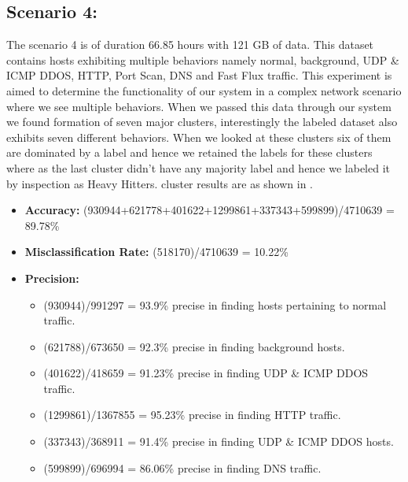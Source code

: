 \subsection{Scenario 4:}
The scenario 4 is of duration 66.85 hours with 121 GB of data. This dataset contains hosts exhibiting multiple behaviors namely normal, background, UDP \& ICMP DDOS, HTTP, Port Scan, DNS and Fast Flux traffic. This experiment is aimed to determine the functionality of our system in a complex network scenario where we see multiple behaviors. When we passed this data through our system we found formation of seven major clusters, interestingly the labeled dataset also exhibits seven different behaviors. When we looked at these clusters six of them are dominated by a label and hence we retained the labels for these clusters where as the last cluster didn't have any majority label and hence we labeled it by inspection as Heavy Hitters. cluster  results are as shown in .

\begin{itemize}
	\item \textbf{Accuracy:}  (930944+621778+401622+1299861+337343+599899)/4710639 = 89.78\%
	
	\item \textbf{Misclassification Rate:} (518170)/4710639 = 10.22\%
	
	\item \textbf{Precision:} 
	\begin{itemize}			
		
		\item (930944)/991297 = 93.9\% precise in finding hosts pertaining to normal traffic.
		
		\item (621788)/673650 = 92.3\% precise in finding background hosts.
		
		\item (401622)/418659 = 91.23\% precise in finding UDP \& ICMP DDOS traffic.
		
		\item (1299861)/1367855 = 95.23\% precise in finding HTTP traffic.
		
		\item (337343)/368911 = 91.4\% precise in finding UDP \& ICMP DDOS hosts.
		
		\item (599899)/696994 = 86.06\% precise in finding DNS traffic.
	\end{itemize}
	
\end{itemize}

